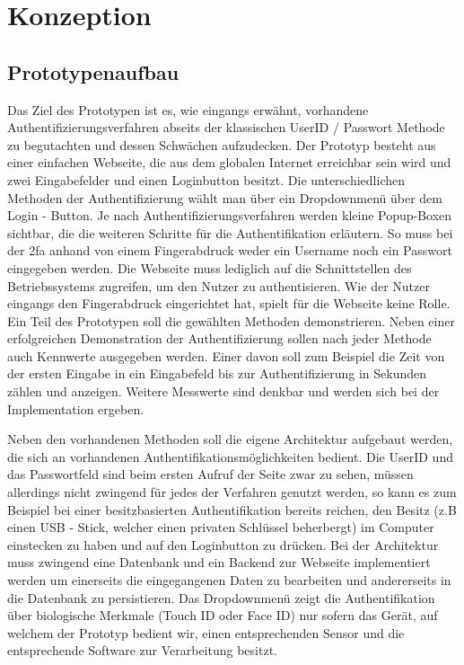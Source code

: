 \chapter{Konzeption}
\section{Prototypenaufbau}
Das Ziel des Prototypen ist es, wie eingangs erwähnt, vorhandene Authentifizierungsverfahren abseits der klassischen UserID / Passwort Methode zu begutachten und dessen Schwächen aufzudecken. Der Prototyp besteht aus einer einfachen Webseite, die aus dem globalen Internet erreichbar sein wird und zwei Eingabefelder und einen Loginbutton besitzt. Die unterschiedlichen Methoden der Authentifizierung wählt man über ein Dropdownmenü über dem Login - Button. Je nach Authentifizierungsverfahren werden kleine Popup-Boxen sichtbar, die die weiteren Schritte für die Authentifikation erläutern. So muss bei der \ac{2fa} anhand von einem Fingerabdruck weder ein Username noch ein Passwort eingegeben werden. Die Webseite muss lediglich auf die Schnittstellen des Betriebssystems zugreifen, um den Nutzer zu authentisieren. Wie der Nutzer eingangs den Fingerabdruck eingerichtet hat, spielt für die Webseite keine Rolle.
Ein Teil des Prototypen soll die gewählten Methoden demonstrieren. Neben einer erfolgreichen Demonstration der Authentifizierung sollen nach jeder Methode auch Kennwerte ausgegeben werden. Einer davon soll zum Beispiel die Zeit von der ersten Eingabe in ein Eingabefeld bis zur Authentifizierung in Sekunden zählen und anzeigen. Weitere Messwerte sind denkbar und werden sich bei der Implementation ergeben.

Neben den vorhandenen Methoden soll die eigene Architektur aufgebaut werden, die sich an vorhandenen Authentifikationsmöglichkeiten bedient. Die UserID und das Passwortfeld sind beim ersten Aufruf der Seite zwar zu sehen, müssen allerdings nicht zwingend für jedes der Verfahren genutzt werden, so kann es zum Beispiel bei einer besitzbasierten Authentifikation bereits reichen, den Besitz (z.B einen USB - Stick, welcher einen privaten Schlüssel beherbergt) im Computer einstecken zu haben und auf den Loginbutton zu drücken. Bei der Architektur muss zwingend eine Datenbank und ein Backend zur Webseite implementiert werden um einerseits die eingegangenen Daten zu bearbeiten und andererseits in die Datenbank zu persistieren. Das Dropdownmenü zeigt die Authentifikation über biologische Merkmale (Touch ID oder Face ID) nur sofern das Gerät, auf welchem der Prototyp bedient wir, einen entsprechenden Sensor und die entsprechende Software zur Verarbeitung besitzt.

